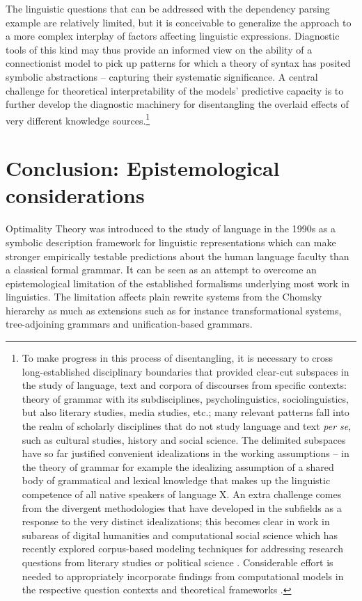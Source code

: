 \documentclass[output=paper,hidelinks]{langscibook}
\begin{document}
\largerpage
The linguistic questions that can be addressed with the dependency parsing example are relatively limited, but it is conceivable to generalize the approach to a more complex interplay of factors affecting linguistic expressions.
Diagnostic tools of this kind may thus provide an informed view on the ability of a connectionist model to pick up patterns for which a theory of syntax has posited symbolic abstractions -- capturing their systematic significance.
A central challenge for theoretical interpretability of the models' predictive capacity is to further develop the diagnostic machinery for disentangling the overlaid effects of very different knowledge sources.\footnote{To make progress in this process of disentangling, it is necessary to cross long-established disciplinary boundaries that provided clear-cut subspaces in the study of language, text and corpora of discourses from specific contexts: theory of grammar with its subdisciplines, psycholinguistics, sociolinguistics, but also literary studies, media studies, etc.; many relevant patterns fall into the realm of scholarly disciplines that do not study language and text \emph{per se}, such as cultural studies, history and social science. The delimited subspaces have so far justified convenient idealizations in the working assumptions -- in the theory of grammar for example the idealizing assumption of a shared body of grammatical and lexical knowledge that makes up the linguistic competence of all native speakers of language X. 
An extra challenge comes from the divergent methodologies that have developed in the subfields as a response to the very distinct idealizations; this becomes clear in work in subareas of digital humanities and computational social science which has recently explored corpus-based modeling techniques for addressing research questions from literary studies \citep{Kuhn-Springer} or political science \citep{pado-etal-2019-sides}. Considerable effort is needed to appropriately incorporate findings from computational models in the respective question contexts and theoretical frameworks \citep{CRETA-book}.}


\section{Conclusion: Epistemological considerations}
\label{sec:OT:conclusion}

Optimality Theory was introduced to the study of language in the 1990s as a symbolic description framework for linguistic representations which can make stronger empirically testable predictions about the human language faculty than a classical formal grammar. It can be seen as an attempt to overcome an epistemological limitation of the established formalisms underlying most work in linguistics. The limitation affects plain rewrite systems from the Chomsky hierarchy as much as extensions such as for instance transformational systems, tree-adjoining grammars and unification-based grammars.
\end{document}
